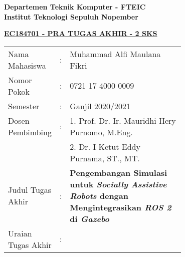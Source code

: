\begin{flushleft}
  \textbf{Departemen Teknik Komputer - FTEIC}\\
  \textbf{Institut Teknologi Sepuluh Nopember}\\
\end{flushleft}

\begin{center}
  \underline{\textbf{EC184701 - PRA TUGAS AKHIR - 2 SKS}}
\end{center}

\begin{adjustwidth}{-0.2cm}{}
  \begin{tabular}{lcp{0.7\linewidth}}

    Nama Mahasiswa &:& Muhammad Alfi Maulana Fikri \\
    Nomor Pokok &:&	0721 17 4000 0009 \\

    Semester &:& Ganjil 2020/2021 \\

    Dosen Pembimbing &:& 1. Prof. Dr. Ir. Mauridhi Hery Purnomo, M.Eng. \\
    & & 2. Dr. I Ketut Eddy Purnama, ST., MT. \\

    Judul Tugas Akhir &:& \textbf{Pengembangan Simulasi untuk \emph{Socially Assistive Robots} dengan Mengintegrasikan \emph{ROS 2} di \emph{Gazebo}} \\

    Uraian Tugas Akhir &:& \\
  \end{tabular}
\end{adjustwidth}

